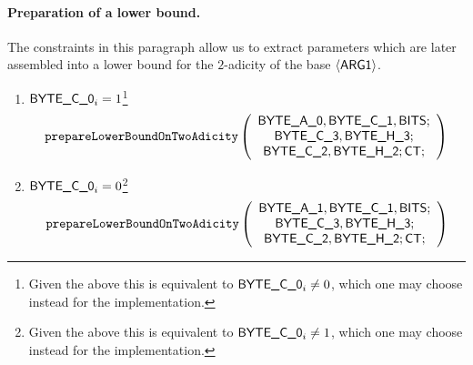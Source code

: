 \paragraph{Preparation of a lower bound.}
The constraints in this paragraph allow us to extract parameters which are later assembled into a lower bound for the $2$-adicity of the base $\langle{}\textsf{ARG}\textsf{1}\rangle{}$.
\begin{enumerate}[resume]
	\item
	\If $\textsf{BYTE}\textsf{\_C\_0}_{i} = 1$\footnote{Given the above this is equivalent to $\textsf{BYTE}\textsf{\_C\_0}_{i} \neq 0$, which one may choose instead for the implementation.} \Then
	\[
			\texttt{prepareLowerBoundOnTwoAdicity}
			\left(
			\begin{array}{c}
			\textsf{BYTE}\textsf{\_A\_0},
			\textsf{BYTE}\textsf{\_C\_1},
			\textsf{BITS}; \\
			\textsf{BYTE}\textsf{\_C\_3},
			\textsf{BYTE}\textsf{\_H\_3}; \\
			\textsf{BYTE}\textsf{\_C\_2},
			\textsf{BYTE}\textsf{\_H\_2};
			\textsf{CT}{};
			\end{array}
			\right) \\
	\]
	\item \If $\textsf{BYTE}\textsf{\_C\_0}_{i} = 0$\footnote{Given the above this is equivalent to $\textsf{BYTE}\textsf{\_C\_0}_{i} \neq 1$, which one may choose instead for the implementation.} \Then
	\[
			\texttt{prepareLowerBoundOnTwoAdicity}
			\left(
			\begin{array}{c}
			\textsf{BYTE}\textsf{\_A\_1},
			\textsf{BYTE}\textsf{\_C\_1},
			\textsf{BITS}; \\
			\textsf{BYTE}\textsf{\_C\_3},
			\textsf{BYTE}\textsf{\_H\_3}; \\
			\textsf{BYTE}\textsf{\_C\_2},
			\textsf{BYTE}\textsf{\_H\_2};
			\textsf{CT}{};
			\end{array}
			\right)
	\]
\end{enumerate}

